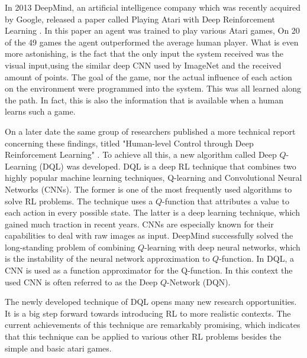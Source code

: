             In 2013 DeepMind, an artificial intelligence company which was recently acquired by Google, released a paper called Playing Atari with Deep Reinforcement Learning \cite{DBLP:journals/corr/MnihKSGAWR13}. In this paper an agent was trained to play various Atari games, On 20 of the 49 games the
            agent outperformed the average human player. What is even more astonishing, is the fact that the only
            input the system received was the visual input,using the similar deep CNN used by ImageNet \cite{Krizhevsky:2012:ICD:2999134.2999257} and the received amount of points.  The goal of the game,
            nor the actual influence of each action on the environment were programmed into the system. This was
            all learned along the path. In fact, this is also the information that is available when a human learns such a
            game. 
            \par
            On a later date the same group of researchers published a more technical report concerning these
            findings, titled "Human-level Control through Deep Reinforcement Learning" \cite{mnih2015humanlevel}.
            To achieve all this, a new algorithm called Deep $Q$-Learning (DQL) was developed. DQL is a deep RL
            technique that combines two highly popular machine learning techniques, Q-learning and Convolutional
            Neural Networks (CNNs). The former is one of the most frequently used algorithms to solve RL problems.
            The technique uses a $Q$-function that attributes a value to each action in every possible state. The latter is
            a deep learning technique, which gained much traction in recent years. CNNs are especially known for
            their capabilities to deal with raw images as input. DeepMind successfully solved the long-standing problem of combining $Q$-learning with deep neural networks, which is the instability of the neural network approximation to $Q$-function. In DQL, a CNN is used as a function approximator for the Q-function. In this context the used CNN is often referred to as the Deep $Q$-Network (DQN).
                
           \par
            The newly developed technique of DQL opens many new research opportunities. It is a big step forward towards introducing RL to more realistic contexts. The current achievements of this technique are remarkably promising, which indicates that this technique can be applied to various other RL problems besides the simple and basic atari games.
            \par
            
